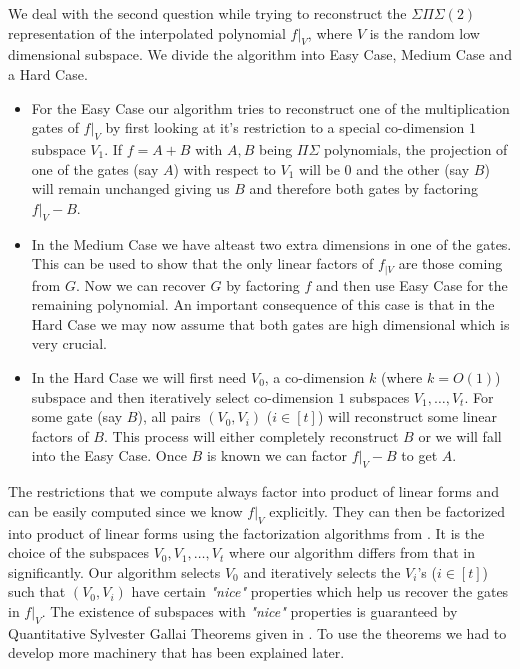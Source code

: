 \documentclass[letterpaper,USenglish,numberwithinsect]{lipics}
\begin{document}
We deal with the second question while trying to reconstruct the $\Sigma\Pi\Sigma(2)$ representation of the
interpolated polynomial $f|_{V}$, where $V$ is the random low dimensional subspace. We divide the algorithm into
Easy Case, Medium Case and a Hard Case.
\begin{itemize}
 \item For the Easy Case our algorithm tries to reconstruct one of the
multiplication gates of $f|_{V}$ by first looking at it's restriction to a special co-dimension $1$ subspace $V_1$.
If $f=A+B$ with $A,B$ being $\Pi\Sigma$ polynomials,
the projection of one of the gates (say $A$) with respect to $V_1$ will be $0$ and the other (say $B$) will remain unchanged giving us
$B$ and therefore both gates by factoring $f|_{V}-B$.

\item In the Medium Case we have alteast two extra dimensions in one of the gates. This can be used to show that the only linear
factors of $f_{|V}$ are those coming from $G$. Now we can recover $G$ by factoring $f$ and then use Easy Case for the remaining
polynomial. An important consequence of this case is that in the Hard Case we may now assume that both gates are high dimensional
which is very crucial.

\item In the Hard Case we will first need $V_0$, a co-dimension $k$ (where $k=O(1)$) subspace and then iteratively select
co-dimension $1$ subspaces $V_1,\ldots,V_t$. For some gate (say $B$), all pairs $(V_0,V_i)$ ($i\in [t]$) will reconstruct some
linear factors of $B$. This process will either completely reconstruct $B$ or we will fall into the Easy Case. Once $B$ is known
we can factor $f|_{V}-B$ to get $A$.
\end{itemize}

The restrictions that we compute always factor into product of linear forms and can be easily computed since we know $f|_{V}$ explicitly. They can then be factorized into
product of linear forms using the factorization algorithms from \cite{KalTr90}. It is the choice of the subspaces $V_0,V_1,\ldots,V_t$
where our algorithm differs from that in \cite{Shpilka07} significantly. Our algorithm selects $V_0$ and iteratively selects the
$V_i$'s ($i\in [t]$) such that $(V_0,V_i)$ have certain
\emph{"nice"} properties which
help us recover the gates in $f|_{V}$. The existence of subspaces with \emph{"nice"} properties is guaranteed by
Quantitative Sylvester Gallai Theorems given in \cite{BDWY11}. To use the theorems we had to develop more machinery that has been explained later.\\
\end{document}
